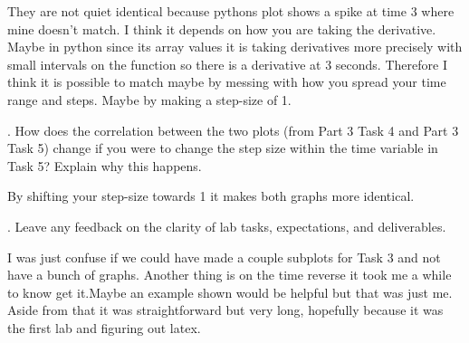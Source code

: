 \documentclass[12pt,a4paper]{article}
\begin{document}
 They are not quiet identical because pythons plot shows a spike at time 3 where mine doesn't match. I think it depends on how you are taking the derivative. Maybe in python since its array values it is taking derivatives more precisely with small intervals on the function so there is a derivative at 3 seconds. Therefore I think it is possible to match maybe by messing with how you spread your time range and steps. Maybe by making a step-size of 1.
\newline

. How does the correlation between the two plots (from Part 3 Task 4 and Part 3 Task 5)
change if you were to change the step size within the time variable in Task 5? Explain why
this happens.
\newline

 By shifting your step-size towards 1 it makes both graphs more identical. 

. Leave any feedback on the clarity of lab tasks, expectations, and deliverables.
\newline

 I was just confuse if we could have made a couple subplots for Task 3 and not have a bunch of graphs. Another thing is on the time reverse it took me a while to know get it.Maybe an example shown would be helpful but that was just me. Aside from that it was straightforward but very long, hopefully because it was the first lab and figuring out latex. 














\end{document}

